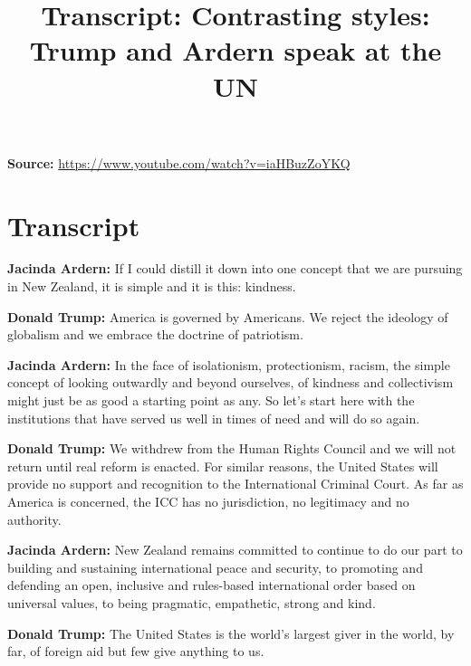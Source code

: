 \documentclass[12pt,a4paper]{article}
\title{Transcript: Contrasting styles: Trump and Ardern speak at the UN}
\author{}
\date{}
\begin{document}
\maketitle

\noindent\textbf{Source:} \url{https://www.youtube.com/watch?v=iaHBuzZoYKQ}

\section*{Transcript}

\textbf{Jacinda Ardern:} If I could distill it down into one concept that we are pursuing in New Zealand, it is simple and it is this: kindness.

\textbf{Donald Trump:} America is governed by Americans. We reject the ideology of globalism and we embrace the doctrine of patriotism.

\textbf{Jacinda Ardern:} In the face of isolationism, protectionism, racism, the simple concept of looking outwardly and beyond ourselves, of kindness and collectivism might just be as good a starting point as any. So let's start here with the institutions that have served us well in times of need and will do so again.

\textbf{Donald Trump:} We withdrew from the Human Rights Council and we will not return until real reform is enacted. For similar reasons, the United States will provide no support and recognition to the International Criminal Court. As far as America is concerned, the ICC has no jurisdiction, no legitimacy and no authority.

\textbf{Jacinda Ardern:} New Zealand remains committed to continue to do our part to building and sustaining international peace and security, to promoting and defending an open, inclusive and rules-based international order based on universal values, to being pragmatic, empathetic, strong and kind.

\textbf{Donald Trump:} The United States is the world's largest giver in the world, by far, of foreign aid but few give anything to us.
\end{document}
